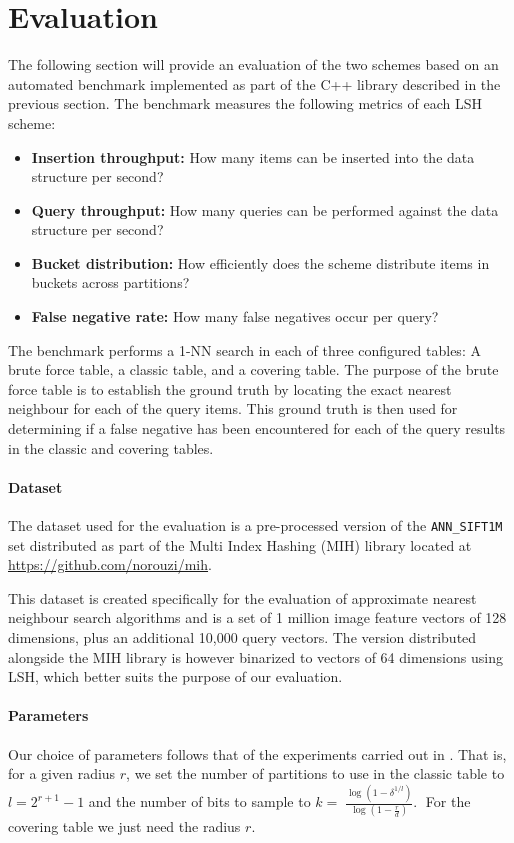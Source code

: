 \section{Evaluation}
\label{evaluation}

The following section will provide an evaluation of the two schemes based on an automated benchmark implemented as part of the C++ library described in the previous section. The benchmark measures the following metrics of each LSH scheme:

\begin{itemize}
  \item \textbf{Insertion throughput:} How many items can be inserted into the data structure per second?
  \item \textbf{Query throughput:} How many queries can be performed against the data structure per second?
  \item \textbf{Bucket distribution:} How efficiently does the scheme distribute items in buckets across partitions?
  \item \textbf{False negative rate:} How many false negatives occur per query?
\end{itemize}

The benchmark performs a 1-NN search in each of three configured tables: A brute force table, a classic table, and a covering table. The purpose of the brute force table is to establish the ground truth by locating the exact nearest neighbour for each of the query items. This ground truth is then used for determining if a false negative has been encountered for each of the query results in the classic and covering tables.

\paragraph{Dataset} The dataset used for the evaluation is a pre-processed version of the \texttt{ANN\_SIFT1M} set distributed as part of the Multi Index Hashing (MIH) library located at \url{https://github.com/norouzi/mih}.

This dataset is created specifically for the evaluation of approximate nearest neighbour search algorithms and is a set of 1 million image feature vectors of 128 dimensions, plus an additional 10,000 query vectors. The version distributed alongside the MIH library is however binarized to vectors of 64 dimensions using LSH, which better suits the purpose of our evaluation.

\paragraph{Parameters} Our choice of parameters follows that of the experiments carried out in \cite{DBLP:journals/corr/PhamP16}. That is, for a given radius $r$, we set the number of partitions to use in the classic table to $l = 2^{r + 1} - 1$ and the number of bits to sample to $k = 􏰢\frac{\log(1 - \delta^{1 / l})}{\log(1 - \frac{r}{d})}$.􏰣 For the covering table we just need the radius $r$.


